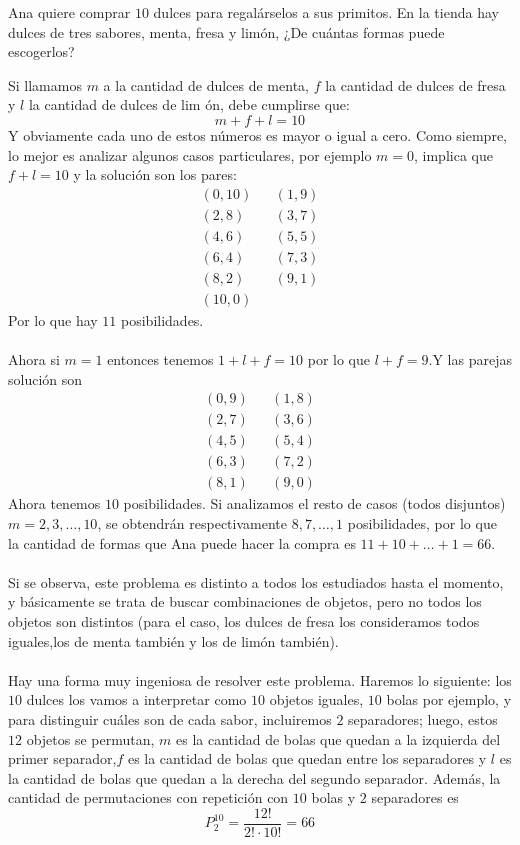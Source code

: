 \begin{ejemplo}
Ana quiere comprar $10$ dulces para regalárselos a sus primitos. En la tienda hay dulces de tres sabores, menta, fresa y limón, ¿De cuántas formas puede escogerlos?
\end{ejemplo}
\begin{solucion}
Si llamamos $m$ a la cantidad de dulces de menta, $f$ la  cantidad  de dulces  de  fresa  y $l$ la  cantidad  de  dulces  de  lim ón,  debe  cumplirse que:
\[m+f+l=10\]
Y obviamente cada uno de estos números es mayor o igual a cero. Como siempre, lo mejor es analizar algunos casos particulares, por ejemplo $m=0$, implica que $f+l=10$ y la solución son los pares:
\begin{eqnarray*}
(0,10)&&(1,9)\\(2,8)&&(3,7)\\
(4,6)&&(5,5)\\ (6,4)&&(7,3)\\
(8,2)&&(9,1)\\ (10,0)
\end{eqnarray*}
Por lo que hay $11$ posibilidades.\\\\
Ahora si $m=1$ entonces tenemos $1+l+f=10$ por lo que $l+f=9$.Y las parejas solución son
\begin{eqnarray*}
(0,9)&&(1,8)\\(2,7)&&(3,6)\\
(4,5)&&(5,4)\\ (6,3)&&(7,2)\\
(8,1)&&(9,0)
\end{eqnarray*}
Ahora tenemos $10$ posibilidades. Si  analizamos  el  resto  de  casos (todos  disjuntos) $m=2,3,\ldots,10$,  se  obtendrán  respectivamente $8,7,\ldots,1$  posibilidades,  por  lo  que  la  cantidad  de  formas  que  Ana puede hacer la compra es $11+10+\ldots+1=66$.\\\\
Si se observa, este problema es distinto a todos los estudiados hasta el  momento,  y  básicamente  se  trata  de  buscar  combinaciones  de objetos, pero  no  todos  los  objetos  son  distintos  (para  el  caso,  los dulces de fresa los consideramos todos iguales,los de menta también y los de limón también).\\\\
Hay una forma muy ingeniosa de resolver este problema. Haremos lo siguiente: los $10$ dulces los vamos a interpretar como $10$ objetos iguales, $10$ bolas por ejemplo, y para  distinguir  cuáles son de cada sabor, incluiremos $2$ separadores; luego, estos $12$ objetos se permutan, $m$ es la cantidad de bolas que quedan a la izquierda del primer separador,$f$ es la cantidad de bolas que quedan entre los separadores y $l$ es la cantidad de bolas que quedan a la derecha del segundo separador. Además, la cantidad de permutaciones  con  repetición con $10$ bolas y $2$ separadores es
\[P^{10}_{2}=\frac{12!}{2!\cdot 10!}=66\]
\end{solucion}
